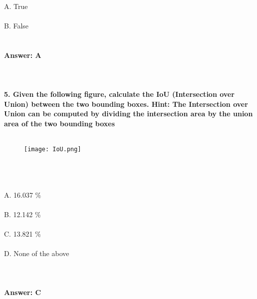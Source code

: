 \documentclass[prl,twocolumn,showpacs,preprintnumbers,superscriptaddress]{revtex4}
\theoremstyle{plain}
\theoremstyle{definition}
\begin{document}
\begin{widetext}
\\
\\
\\
A. True
\\
\\
B. False
\\
\\
\\
\textbf{Answer: A}
\\
\\
\\
\\
\textbf{5. Given the following figure, calculate the IoU (Intersection over Union) between the two bounding boxes. Hint: The Intersection over Union can be computed by dividing the intersection area by the union area of the two bounding boxes}
\\
\\
\begin{figure}[H]
\begin{center}
    \texttt{[image: IoU.png]}
\end{center}
\end{figure}
\\
\\
\\
\noindent A. 16.037 \%
\\
\\
B. 12.142 \%
\\
\\
C. 13.821 \%
\\
\\
D. None of the above
\\
\\
\\
\\
\textbf{Answer: C}
\\
\\
\\
\\
\\
\\
\end{widetext}
\end{document}
